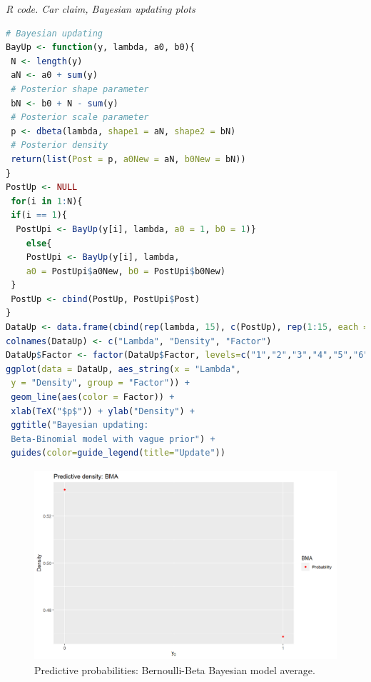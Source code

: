 \begin{enumerate}[leftmargin=*]
\begin{tcolorbox}[enhanced,width=4.67in,center upper,
	fontupper=\large\bfseries,drop shadow southwest,sharp corners]
	\textit{R code. Car claim, Bayesian updating plots}
\begin{VF}
\begin{lstlisting}[language=R]
# Bayesian updating
BayUp <- function(y, lambda, a0, b0){
 N <- length(y)
 aN <- a0 + sum(y) 
 # Posterior shape parameter
 bN <- b0 + N - sum(y)    
 # Posterior scale parameter
 p <- dbeta(lambda, shape1 = aN, shape2 = bN) 
 # Posterior density
 return(list(Post = p, a0New = aN, b0New = bN))
}			
PostUp <- NULL
 for(i in 1:N){
 if(i == 1){
  PostUpi <- BayUp(y[i], lambda, a0 = 1, b0 = 1)}
	else{
	PostUpi <- BayUp(y[i], lambda, 
	a0 = PostUpi$a0New, b0 = PostUpi$b0New)
 }
 PostUp <- cbind(PostUp, PostUpi$Post)
}		
DataUp <- data.frame(cbind(rep(lambda, 15), c(PostUp), rep(1:15, each = 1000)))  #Data frame
colnames(DataUp) <- c("Lambda", "Density", "Factor")
DataUp$Factor <- factor(DataUp$Factor, levels=c("1","2","3","4","5","6","7","8","9","10","11","12","13","14","15"), labels=c("Iter_1","Iter_2","Iter_3","Iter_4","Iter_5","Iter_6","Iter_7","Iter_8","Iter_9","Iter_10","Iter_11","Iter_12","Iter_13","Iter_14","Iter_15"))			
ggplot(data = DataUp, aes_string(x = "Lambda", 
 y = "Density", group = "Factor")) + 
 geom_line(aes(color = Factor)) +
 xlab(TeX("$p$")) + ylab("Density") +
 ggtitle("Bayesian updating: 
 Beta-Binomial model with vague prior") +
 guides(color=guide_legend(title="Update")) 		
\end{lstlisting}
\end{VF}
\end{tcolorbox}


\begin{figure}[!h]
	\includegraphics[width=340pt, height=200pt]{Chapters/chapter1/figures/BMA.png}
	\caption[List of figure caption goes here]{Predictive probabilities: Bernoulli-Beta Bayesian model average.}\label{fig14}
\end{figure}


\end{enumerate}
